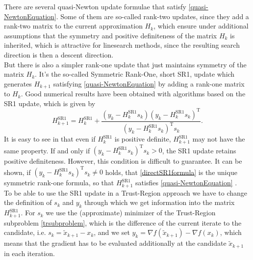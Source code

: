 There are several quasi-Newton update formulae that satisfy \cref{quasi-NewtonEquation}. Some of them are so-called rank-two updates, since they add a rank-two matrix to the current approximation $H_k$, which ensure under additional assumptions that the symmetry and positive definiteness of the matrix $H_k$ is inherited, which is attractive for linesearch methods, since the resulting search direction is then a descent direction. \\
But there is also a simpler rank-one update that just maintains symmetry of the matrix $H_k$. It's the so-called Symmetric Rank-One, short SR1, update which generates $H_{k+1}$ satisfying \cref{quasi-NewtonEquation} by adding a rank-one matrix to $H_k$. Good numerical results have been obtained with algorithms based on the SR1 update, which is given by
\begin{equation}\label{directSR1formula}
    H^\mathrm{SR1}_{k+1} = H^\mathrm{SR1}_k + \frac{(y_k - H^\mathrm{SR1}_k s_k) (y_k - H^\mathrm{SR1}_k s_k)^{\mathrm{T}}}{(y_k - H^\mathrm{SR1}_k s_k)^{\mathrm{T}} s_k}.
\end{equation}
It is easy to see in that even if $H^\mathrm{SR1}_k$ is positive definite, $H^\mathrm{SR1}_{k+1}$ may not have the same property. If and only if $(y_k - H^\mathrm{SR1}_k s_k)^{\mathrm{T}} s_k > 0$, the SR1 update retains positive definiteness. However, this condition is difficult to guarantee. It can be shown, if $(y_k - H^\mathrm{SR1}_k s_k)^{\mathrm{T}} s_k \neq 0$ holds, that \cref{directSR1formula} is the unique symmetric rank-one formula, so that $H^\mathrm{SR1}_{k+1}$ satisfies \cref{quasi-NewtonEquation} \cite[p.~144-145]{NocedalWright:2006}. \\

To be able to use the SR1 update in a Trust-Region approach we have to change the definition of $s_k$ and $y_k$ through which we get information into the matrix $H^\mathrm{SR1}_{k+1}$. For $s_k$ we use the (approximate) minimizer of the Trust-Region subproblem \cref{trsubproblem}, which is the difference of the current iterate to the candidate, i.e. $s_k = \widetilde{x}_{k+1} - x_k$, and we set $y_k = \nabla f(\widetilde{x}_{k+1}) - \nabla f(x_k)$, which means that the gradient has to be evaluated additionally at the candidate $\widetilde{x}_{k+1}$ in each iteration. \\

